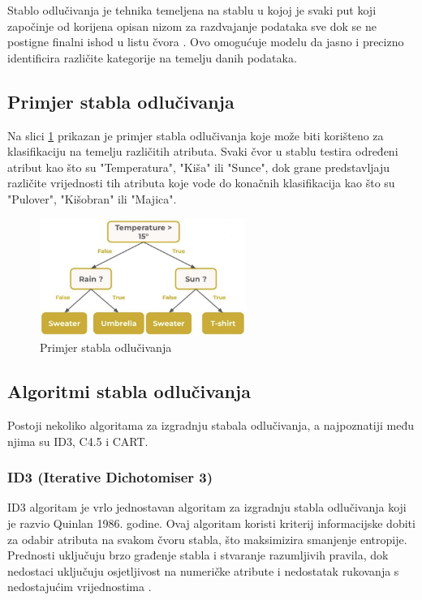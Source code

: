 \documentclass[zavrsnirad]{fer}
\begin{document}
Stablo odlučivanja je tehnika temeljena na stablu u kojoj je svaki put koji započinje od korijena opisan nizom za razdvajanje podataka sve dok se ne postigne finalni ishod u listu čvora \cite{Charbuty_Abdulazeez_2021}. Ovo omogućuje modelu da jasno i precizno identificira različite kategorije na temelju danih podataka.

\subsection{Primjer stabla odlučivanja}
Na slici \ref{fig:decision_tree} prikazan je primjer stabla odlučivanja koje može biti korišteno za klasifikaciju na temelju različitih atributa. Svaki čvor u stablu testira određeni atribut kao što su "Temperatura", "Kiša" ili "Sunce", dok grane predstavljaju različite vrijednosti tih atributa koje vode do konačnih klasifikacija kao što su "Pulover", "Kišobran" ili "Majica".

\begin{figure}[h]
	\centering
	\includegraphics[width=0.6\textwidth]{Figures/DecisionTree.jpg}
	\caption{Primjer stabla odlučivanja \cite{Keldenich2022}}
	\label{fig:decision_tree}
\end{figure}

\subsection{Algoritmi stabla odlučivanja}
Postoji nekoliko algoritama za izgradnju stabala odlučivanja, a najpoznatiji među njima su ID3, C4.5 i CART.

\subsubsection{ID3 (Iterative Dichotomiser 3)}
ID3 algoritam je vrlo jednostavan algoritam za izgradnju stabla odlučivanja koji je razvio Quinlan 1986. godine. Ovaj algoritam koristi kriterij informacijske dobiti za odabir atributa na svakom čvoru stabla, što maksimizira smanjenje entropije. Prednosti uključuju brzo građenje stabla i stvaranje razumljivih pravila, dok nedostaci uključuju osjetljivost na numeričke atribute i nedostatak rukovanja s nedostajućim vrijednostima \cite{singh2014}.
\end{document}
